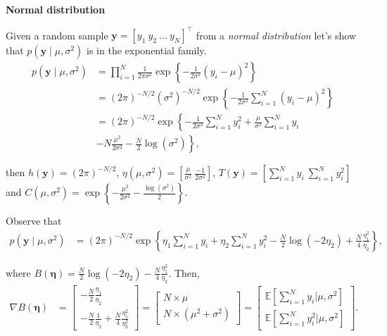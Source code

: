 \begin{enumerate}
\textbf{Normal distribution} 

Given a random sample $\bm{y}=[y_1 \ y_2 \ \dots \ y_N]^{\top}$ from a \textit{normal distribution} let's show that $p(\bm{y}\mid \mu,\sigma^2)$ is in the exponential family.
\begin{align}
	p(\bm{y}\mid \mu,\sigma^2)&=\prod_{i=1}^N \frac{1}{2\pi\sigma^2}\exp\left\{-\frac{1}{2\sigma^2}\left(y_i-\mu\right)^2\right\}\nonumber\\
	&= (2\pi)^{-N/2}(\sigma^2)^{-N/2}\exp\left\{-\frac{1}{2\sigma^2}\sum_{i=1}^N\left(y_i-\mu\right)^2\right\}\nonumber\\
	&= (2\pi)^{-N/2}\exp\left\{-\frac{1}{2\sigma^2}\sum_{i=1}^Ny_i^2+\frac{\mu}{\sigma^2}\sum_{i=1}^N y_i\right.\nonumber\\
	&-\left.N\frac{\mu^2}{2\sigma^2}-\frac{N}{2}\log(\sigma^2)\right\}\nonumber,	
\end{align}

then $h(\bm{y})=(2\pi)^{-N/2}$, $\eta(\mu,\sigma^2)=\left[\frac{\mu}{\sigma^2} \ \frac{-1}{2\sigma^2}\right]$, $T(\bm{y})=\left[\sum_{i=1}^N y_i \ \sum_{i=1}^N y_i^2\right]$ and $C(\mu,\sigma^2)=\exp\left\{-\frac{\mu^2}{2\sigma^2}-\frac{\log(\sigma^2)}{2}\right\}$.

Observe that 
\begin{align}
	p(\bm{y}\mid \mu,\sigma^2)&= (2\pi)^{-N/2}\exp\left\{\eta_1\sum_{i=1}^N y_i+\eta_2\sum_{i=1}^Ny_i^2-\frac{N}{2}\log(-2\eta_2)+\frac{N}{4}\frac{\eta_1^2}{\eta_2}\right\}\nonumber,
\end{align}

where $B(\bm{\eta})=\frac{N}{2}\log(-2\eta_2)-\frac{N}{4}\frac{\eta_1^2}{\eta_2}$. Then,
\begin{align*}
	\nabla B(\bm{\eta}) & = \begin{bmatrix}
		-\frac{N}{2}\frac{\eta_1}{\eta_2}\\
		-\frac{N}{2}\frac{1}{\eta_2}+\frac{N}{4}\frac{\eta_1^2}{\eta_2^2}
	\end{bmatrix}
	=
	\begin{bmatrix}
		N\times\mu\\
		N\times(\mu^2+\sigma^2)
	\end{bmatrix}  = \begin{bmatrix}
		\mathbb{E}\left[\sum_{i=1}^N y_i\bigr\rvert \mu,\sigma^2\right]\\
		\mathbb{E}\left[\sum_{i=1}^N y_i^2\bigr\rvert \mu,\sigma^2\right]
	\end{bmatrix}. 
\end{align*}
\\


\end{enumerate}
